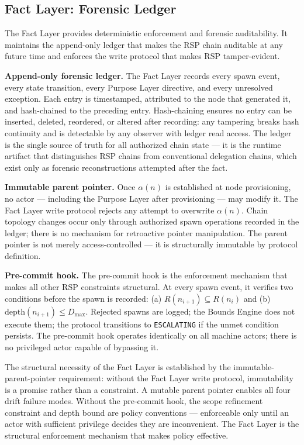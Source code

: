 \subsection{Fact Layer: Forensic Ledger}
\label{sec:rs-fact-ledger}

The Fact Layer provides deterministic enforcement and forensic auditability. It maintains the append-only ledger that makes the RSP chain auditable at any future time and enforces the write protocol that makes RSP tamper-evident.

\medskip
\noindent\textbf{Append-only forensic ledger.} The Fact Layer records every spawn event, every state transition, every Purpose Layer directive, and every unresolved exception. Each entry is timestamped, attributed to the node that generated it, and hash-chained to the preceding entry. Hash-chaining ensures no entry can be inserted, deleted, reordered, or altered after recording: any tampering breaks hash continuity and is detectable by any observer with ledger read access. The ledger is the single source of truth for all authorized chain state — it is the runtime artifact that distinguishes RSP chains from conventional delegation chains, which exist only as forensic reconstructions attempted after the fact.

\medskip
\noindent\textbf{Immutable parent pointer.} Once $\alpha(n)$ is established at node provisioning, no actor — including the Purpose Layer after provisioning — may modify it. The Fact Layer write protocol rejects any attempt to overwrite $\alpha(n)$. Chain topology changes occur only through authorized spawn operations recorded in the ledger; there is no mechanism for retroactive pointer manipulation. The parent pointer is not merely access-controlled — it is structurally immutable by protocol definition.

\medskip
\noindent\textbf{Pre-commit hook.} The pre-commit hook is the enforcement mechanism that makes all other RSP constraints structural. At every spawn event, it verifies two conditions before the spawn is recorded: (a) $R(n_{i+1}) \subseteq R(n_i)$ and (b) $\mathrm{depth}(n_{i+1}) \leq D_{\mathrm{max}}$. Rejected spawns are logged; the Bounds Engine does not execute them; the protocol transitions to \texttt{ESCALATING} if the unmet condition persists. The pre-commit hook operates identically on all machine actors; there is no privileged actor capable of bypassing it.

The structural necessity of the Fact Layer is established by the immutable-parent-pointer requirement: without the Fact Layer write protocol, immutability is a promise rather than a constraint. A mutable parent pointer enables all four drift failure modes. Without the pre-commit hook, the scope refinement constraint and depth bound are policy conventions — enforceable only until an actor with sufficient privilege decides they are inconvenient. The Fact Layer is the structural enforcement mechanism that makes policy effective.

